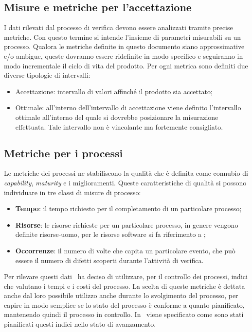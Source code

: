 \subsection{Misure e metriche per l'accettazione}
I dati rilevati dal processo di verifica devono essere analizzati tramite precise metriche.
Con questo termine si intende l'insieme di parametri misurabili su un processo. Qualora le metriche definite in questo documento siano approssimative e/o ambigue, queste dovranno essere ridefinite in modo specifico e seguiranno in modo incrementale il ciclo di vita del prodotto.
Per ogni metrica sono definiti due diverse tipologie di intervalli:
\begin{itemize}
\item Accettazione: intervallo di valori affinché il prodotto sia accettato;
\item Ottimale: all'interno dell'intervallo di accettazione viene definito l'intervallo ottimale all'interno del quale si dovrebbe posizionare la misurazione effettuata. Tale intervallo non è vincolante ma fortemente consigliato.
\end{itemize}
\subsection{Metriche per i processi}
Le metriche dei processi ne stabiliscono la qualità che è definita come connubio di \textit{capability}, \textit{maturity} e i miglioramenti. Queste caratteristiche di qualità si possono individuare in tre classi di misure di processo:
\begin{itemize}
\item \textbf{Tempo}: il tempo richiesto per il completamento di un particolare processo;
\item \textbf{Risorse}: le risorse richieste per un particolare processo, in genere vengono definite risorse-uomo, per le risorse software si fa riferimento a \infoNDP;
\item \textbf{Occorrenze}: il numero di volte che capita un particolare evento, che può essere il numero di difetti scoperti durante l'attività di verifica.
\end{itemize}
Per rilevare questi dati \gruppo ~ha deciso di utilizzare, per il controllo dei processi, indici che valutano i tempi e i costi del processo. La scelta di queste metriche è dettata anche dal loro possibile utilizzo anche durante lo svolgimento del processo, per capire in modo semplice se lo stato del processo è conforme a quanto pianificato, mantenendo quindi il processo in controllo. In \infoPDP ~viene specificato come sono stati pianificati questi indici nello stato di avanzamento.
